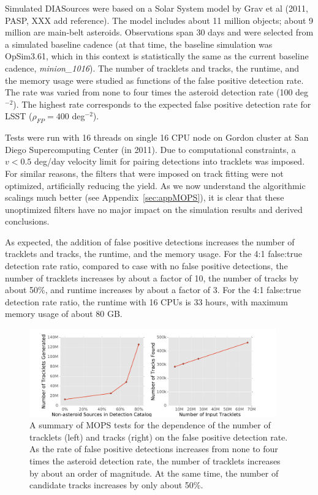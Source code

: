 Simulated DIASources were based on a Solar System model by Grav et al (2011, PASP, XXX add reference).
The model includes about 11 million objects; about 9 million are main-belt asteroids. Observations span
30 days and were selected from a simulated baseline cadence (at that time, the baseline simulation was
OpSim3.61, which in this context is statistically the same as the current baseline cadence, {\it minion\_1016}). 
The number of tracklets and tracks, the runtime, and the memory usage were studied as functions of 
the false positive detection rate. The rate was varied from none to four times the asteroid detection rate 
(100 deg$^{-2}$).  The highest rate corresponds to the expected false positive detection rate for LSST 
($\rho_{FP} =  400$ deg$^{-2}$). 

Tests were run with 16 threads on single 16 CPU node on Gordon cluster at San Diego Supercomputing
Center (in 2011). Due to computational constraints, a $v < 0.5$ deg/day velocity limit for pairing detections
into tracklets was imposed. For similar reasons, the filters that were imposed on track fitting were not 
optimized, artificially reducing the yield. As we now understand the algorithmic scalings much better 
(see Appendix~\ref{sec:appMOPS}), it is clear that these unoptimized filters have no major impact on the 
simulation results and derived conclusions. 

As expected, the addition of false positive detections increases the number of tracklets and tracks, 
the runtime, and the memory usage. For the 4:1 false:true detection rate ratio, compared to case with 
no false positive detections, the number of tracklets increases by about 
a factor of 10, the number of tracks by about 50\%, and runtime increases by about a factor of 3. 
For the 4:1 false:true detection rate ratio, the runtime with 16 CPUs is 33 hours, with maximum memory 
usage of about 80 GB.  




\begin{figure}[t!]
\centering
\vskip -0.3in
\includegraphics[width=0.95\textwidth]{figures/track_stats}
\caption{A summary of MOPS tests for the dependence of the number of tracklets (left)
and tracks (right) on the false positive detection rate. As the rate of false positive detections
increases from none to four times the asteroid detection rate, the number of tracklets
increases by about an order of magnitude. At the same time, the number of candidate
tracks increases by only about 50\%.
\label{fig:MOPStests}}
\end{figure}




